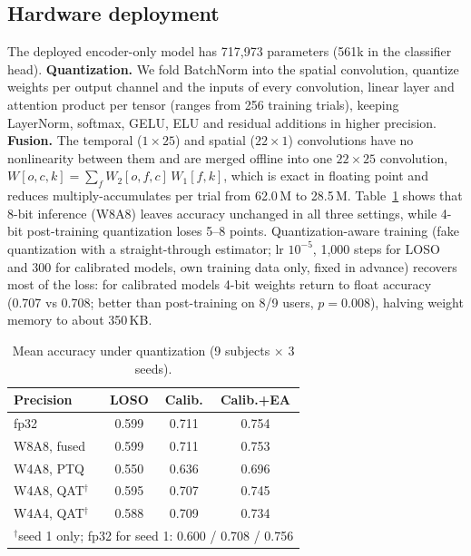 \documentclass[conference]{IEEEtran}
\begin{document}
\subsection{Hardware deployment}\label{sec:hw}
The deployed encoder-only model has 717,973 parameters (561k in the classifier head). \textbf{Quantization.} We fold
BatchNorm into the spatial convolution, quantize weights per output channel and the inputs of every convolution, linear
layer and attention product per tensor (ranges from 256 training trials), keeping LayerNorm, softmax, GELU, ELU and
residual additions in higher precision. \textbf{Fusion.} The temporal ($1\times25$) and spatial ($22\times1$) convolutions
have no nonlinearity between them and are merged offline into one $22\times25$ convolution,
$W[o,c,k]=\sum_f W_2[o,f,c]\,W_1[f,k]$, which is exact in floating point and reduces multiply-accumulates per trial from
62.0\,M to 28.5\,M. Table~\ref{tab:quant} shows that 8-bit inference (W8A8) leaves accuracy unchanged in all three
settings, while 4-bit post-training quantization loses 5--8 points. Quantization-aware training (fake quantization with a straight-through estimator; lr $10^{-5}$,
1,000 steps for LOSO and 300 for calibrated models, own training data only, fixed in advance) recovers most of the loss:
for calibrated models 4-bit weights return to float accuracy (0.707 vs 0.708; better than post-training on 8/9 users,
$p=0.008$), halving weight memory to about 350\,KB.

\begin{table}[t]\centering\caption{Mean accuracy under quantization (9 subjects $\times$ 3 seeds).}\label{tab:quant}
\begin{tabular}{lccc}\toprule
Precision & LOSO & Calib. & Calib.+EA \\ \midrule
fp32 & 0.599 & 0.711 & 0.754 \\
W8A8, fused & 0.599 & 0.711 & 0.753 \\
W4A8, PTQ & 0.550 & 0.636 & 0.696 \\
W4A8, QAT$^\dagger$ & 0.595 & 0.707 & 0.745 \\
W4A4, QAT$^\dagger$ & 0.588 & 0.709 & 0.734 \\
\multicolumn{4}{l}{\footnotesize $^\dagger$seed 1 only; fp32 for seed 1: 0.600 / 0.708 / 0.756} \\
\bottomrule
\end{tabular}\end{table}
\end{document}
